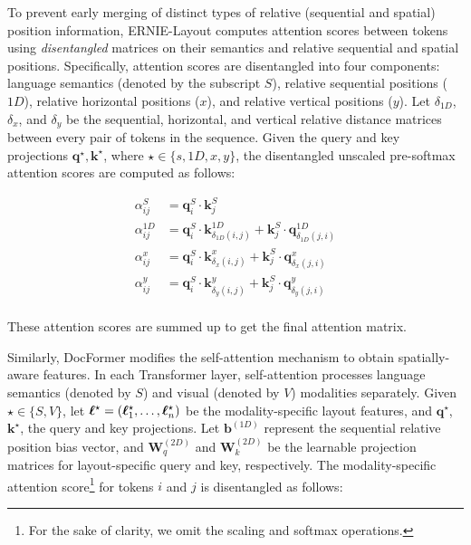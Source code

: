 To prevent early merging of distinct types of relative (sequential and spatial) position information, ERNIE-Layout \citep{peng2022ernie} computes attention scores between tokens using \textit{disentangled} matrices on their semantics and relative sequential and spatial positions. Specifically, attention scores are disentangled into four components: language semantics (denoted by the subscript $S$), relative sequential positions ($1D$), relative horizontal positions ($x$), and relative vertical positions ($y$). Let $\delta_{1D}$, $\delta_x$, and $\delta_y$ be the sequential, horizontal, and vertical relative distance matrices between every pair of tokens in the sequence. Given the query and key projections $\bm{q}^\star, \bm{k}^\star$, where $\star \in \{s, 1D, x, y\}$, the disentangled unscaled pre-softmax attention scores are computed as follows:

\begin{equation}
\begin{aligned}
    \alpha^{S}_{ij} &= \bm{q}^{S}_i \cdot \bm{k}^{S}_j \\
    \alpha^{1D}_{ij} &= \bm{q}^{S}_i \cdot \bm{k}^{1D}_{\delta_{1D}(i, j)} + \bm{k}^{S}_j  \cdot \bm{q}^{1D}_{\delta_{1D}(j, i)} \\
    \alpha^{x}_{ij} &= \bm{q}^{S}_i \cdot \bm{k}^{x}_{\delta_{x}(i, j)} + \bm{k}^{S}_j  \cdot \bm{q}^{x}_{\delta_{x}(j, i)} \\
    \alpha^{y}_{ij} &= \bm{q}^{S}_i \cdot \bm{k}^{y}_{\delta_{y}(i, j)} + \bm{k}^{S}_j  \cdot \bm{q}^{y}_{\delta_{y}(j, i)} \\
\end{aligned}
\label{eq:ernie-layout-attention}
\end{equation}

\noindent These attention scores are summed up to get the final attention matrix.

Similarly, DocFormer \citep{appalaraju2021docformer} modifies the self-attention mechanism to obtain spatially-aware features. In each Transformer layer, self-attention processes language semantics (denoted by $S$) and visual (denoted by $V$) modalities separately. Given $\star \in \{S, V\}$, let $\boldsymbol{\ell}^{\star} = (\boldsymbol{\ell}^{\star}_1, \ldots, \boldsymbol{\ell}^{\star}_n)$ be the modality-specific layout features, and $\bm{q}^\star$, $\bm{k}^\star$, the query and key projections. Let $\bm{b}^{(1D)}$ represent the sequential relative position bias vector, and $\bm{W}^{(2D)}_q$ and $\bm{W}^{(2D)}_k$ be the learnable projection matrices for layout-specific query and key, respectively. The modality-specific attention score\footnote{For the sake of clarity, we omit the scaling and softmax operations.} for tokens $i$ and $j$ is disentangled as follows:


